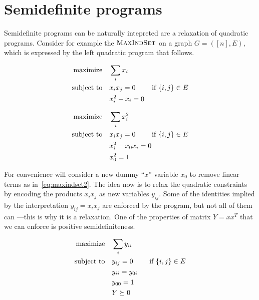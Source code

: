 \documentclass[a4paper,twoside,justified]{tufte-handout}
\begin{document}
\section{Semidefinite programs}

Semidefinite programs can be naturally intepreted are a relaxation of
quadratic programs. Consider for example the $
\textsc{MaxIndSet} $ on a graph $ G=([n],E) $, which is
expressed by the left quadratic program that follows.

\begin{figure*}
\begin{minipage}[t]{0.5\textwidth}
\begin{alignat}{2}
  \maximize \sum_{i}x_{i} \notag\\
  \subjectto x_{i}x_{j} =0 \qquad \text{\ if $\{i,j\}\in E$} \label{eq:maxindset1}\\
  & x^{2}_{i} -x_{i}= 0 \notag
\end{alignat}
\end{minipage}
\begin{minipage}[t]{0.5\textwidth}
\begin{alignat}{2}
  \maximize \sum_{i}x^{2}_{i} \notag\\
  \subjectto x_{i}x_{j} =0 \qquad \text{\ if $\{i,j\}\in E$} \label{eq:maxindset2}\\
  & x^{2}_{i} -x_{0}x_{i} =0 \notag\\
  & x^{2}_{0} = 1 \notag
\end{alignat}
\end{minipage}
\end{figure*}


For convenience will consider a new dummy ``$x$'' variable $ x_{0} $
to remove linear terms as in~\eqref{eq:maxindset2}.
%
The idea now is to relax the quadratic constraints by encoding the
products $x_{i}x_{j} $ as new variables $ y_{ij} $. Some of the
identities implied by the interpretation $ y_{ij} = x_{i}x_{j} $ are
enforced by the program, but not all of them can ---this is why it is
a relaxation. One of the properties of matrix $ Y =xx^{T} $ that we
can enforce is positive semidefiniteness.  
%

\begin{alignat*}{2}
  \text{maximize}\hspace{1em}& \sum_{i}y_{ii}\\
  \text{subject to}\hspace{1em}& y_{ij} =0 \qquad \text{\ if $\{i,j\}\in E$}\\
  & y_{ii} = y_{0i} \\
  & y_{00} = 1\\
  & Y \succeq 0
\end{alignat*}
\end{document}
